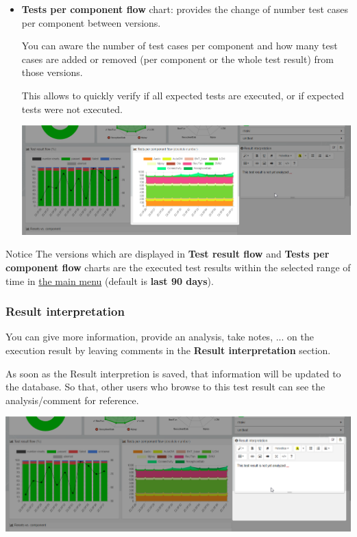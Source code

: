 \begin{itemize}
\item \textbf{Tests per component flow} chart: provides the change of number test
cases per component between versions.

You can aware the number of test cases per component and how many test cases are
added or removed (per component or the whole test result) from those versions.

This allows to quickly verify if all expected tests are executed, or if expected
tests were not executed.

\includegraphics[width=1\linewidth]
{./pictures/dashboard/chart_tests_per_component_flow.png}
\end{itemize}

\begin{boxhint}{Notice}
The versions which are displayed in \textbf{Test result flow} and
\textbf{Tests per component flow} charts are the executed test results within
the selected range of time in
\hyperref[main-menu]{the main menu} (default is \textbf{last 90 days}).
\end{boxhint}


\subsubsection{Result interpretation}
You can give more information, provide an analysis, take notes, ... on the
execution result by leaving comments in the \textbf{Result interpretation}
section.

As soon as the Result interpretion is saved, that information will be updated to
the database. So that, other users who browse to this test result can see
the analysis/comment for reference.

\includegraphics[width=1\linewidth]
{./pictures/dashboard/result_interpretation.png}

